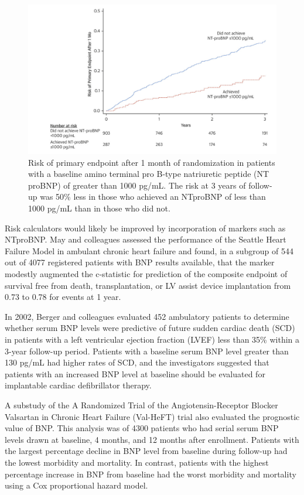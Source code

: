 \documentclass[14pt,a4paper,onecolumn]{extarticle}
\begin{document}
\begin{figure}   \includegraphics{../../images/NTBNP_zile.png}   \caption{Risk of primary endpoint after 1 month of randomization in patients with a baseline amino terminal pro B-type natriuretic peptide (NT proBNP) of greater than 1000 pg/mL. The risk at 3 years of follow-up was 50\% less in those who achieved an NTproBNP of less than 1000 pg/mL than in those who did not. \citep{Zile2016}}   \label{NTBNP_zile} \end{figure}

Risk calculators would likely be improved by incorporation of markers such as NTproBNP. May and colleagues assessed the performance of the Seattle Heart Failure Model in ambulant chronic heart failure and found, in a subgroup of 544 out of 4077 registered patients with BNP results available, that the marker modestly augmented the c-statistic for prediction of the composite endpoint of survival free from death, transplantation, or LV assist device implantation from 0.73 to 0.78 for events at 1 year. \citep{May2007}

In 2002, Berger and colleagues  evaluated 452 ambulatory patients to determine whether serum BNP levels were predictive of future sudden cardiac death (SCD) in patients with a left ventricular ejection fraction (LVEF) less than 35\% within a 3-year follow-up period. Patients with a baseline serum BNP level greater than 130 pg/mL had higher rates of SCD, and the investigators suggested that patients with an increased BNP level at baseline should be evaluated for implantable cardiac defibrillator therapy. \citep{Berger2002} %

A substudy of the A Randomized Trial of the Angiotensin-Receptor Blocker Valsartan in Chronic Heart Failure (Val-HeFT) trial also evaluated the prognostic value of BNP. This analysis was of 4300 patients who had serial serum BNP levels drawn at baseline, 4 months, and 12 months after enrollment. Patients with the largest percentage decline in BNP level from baseline during follow-up had the lowest morbidity and mortality. In contrast, patients with the highest percentage increase in BNP from baseline had the worst morbidity and mortality using a Cox proportional hazard model. \citep{Anand2003} %
\end{document}

